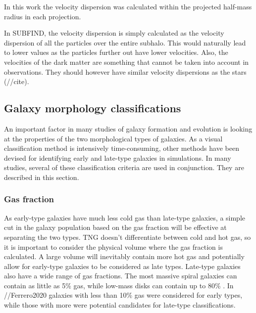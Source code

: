 In this work the velocity dispersion was calculated within the projected half-mass radius in each projection.

In SUBFIND, the velocity dispersion is simply calculated as the velocity dispersion of all the particles over the entire subhalo. This would naturally lead to lower values as the particles further out have lower velocities. Also, the velocities of the dark matter are something that cannot be taken into account in observations. They should however have similar velocity dispersions as the stars (//cite).


\subsection{Galaxy morphology classifications}

An important factor in many studies of galaxy formation and evolution is looking at the properties of the two morphological types of galaxies. As a visual classification method is intensively time-consuming, other methods have been devised for identifying early and late-type galaxies in simulations. In many studies, several of these classification criteria are used in conjunction. They are described in this section.

\subsubsection{Gas fraction}
As early-type galaxies have much less cold gas than late-type galaxies, a simple cut in the galaxy population based on the gas fraction will be effective at separating the two types. TNG doesn't differentiate between cold and hot gas, so it is important to consider the physical volume where the gas fraction is calculated. A large volume will inevitably contain more hot gas and potentially allow for early-type galaxies to be considered as late types. Late-type galaxies also have a wide range of gas fractions. The most massive spiral galaxies can contain as little as 5\% gas, while low-mass disks can contain up to 80\% \parencite{Mo2010}. In //Ferrero2020 galaxies with less than 10\% gas were considered for early types, while those with more were potential candidates for late-type classifications.

